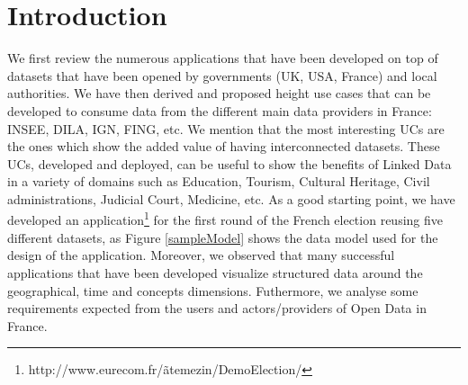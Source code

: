\documentclass[a4paper,11pt]{report}
\begin{document}
\section{Introduction}
We first review the numerous applications that have been developed on top of datasets that have been opened by governments (UK, USA, France) and local authorities. We have then derived and proposed height use cases  that can be developed to consume data from the different main data providers in France: INSEE, DILA, IGN, FING, etc. We mention that the most interesting UCs are the ones which show the added value of having interconnected datasets. These UCs,  developed and deployed, can be useful to show the benefits of Linked Data in a variety of domains such as Education, Tourism, Cultural Heritage, Civil administrations, Judicial Court, Medicine, etc. As a good starting point, we have developed an application\footnote{http://www.eurecom.fr/\~atemezin/DemoElection/} for the first round of the French election reusing five different datasets, as Figure \ref{sampleModel} shows the data model used for the design of the application. Moreover, we observed that many successful applications that have been developed visualize structured data around the geographical, time and concepts dimensions. Futhermore, we analyse some requirements expected from the users and actors/providers of Open Data in France. 
\end{document}
